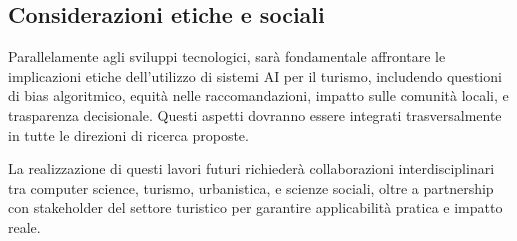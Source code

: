 \subsection{Considerazioni etiche e sociali}

Parallelamente agli sviluppi tecnologici, sarà fondamentale affrontare le implicazioni etiche dell'utilizzo di sistemi AI per il turismo, includendo questioni di bias algoritmico, equità nelle raccomandazioni, impatto sulle comunità locali, e trasparenza decisionale. Questi aspetti dovranno essere integrati trasversalmente in tutte le direzioni di ricerca proposte.

La realizzazione di questi lavori futuri richiederà collaborazioni interdisciplinari tra computer science, turismo, urbanistica, e scienze sociali, oltre a partnership con stakeholder del settore turistico per garantire applicabilità pratica e impatto reale.